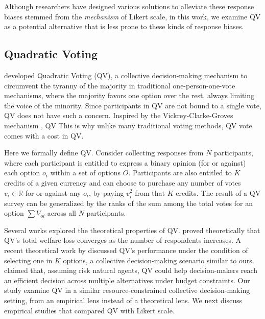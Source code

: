 Although researchers have designed various solutions to alleviate these response biases stemmed from the \textit{mechanism} of Likert scale, in this work, we examine QV as a potential alternative that is less prone to these kinds of response biases.

\subsection{Quadratic Voting}
\textcite{posner2018radical} developed Quadratic Voting (QV), a collective decision-making mechanism \cite{lalley2018quadratic} to circumvent the tyranny of the majority in traditional one-person-one-vote mechanisms, where the majority favors one option over the rest, always limiting the voice of the minority. Since participants in QV are not bound to a single vote, QV does not have such a concern. Inspired by the Vickrey-Clarke-Groves mechanism \cite{roughgarden2010algorithmic}, QV  This is why unlike many traditional voting methods, QV vote comes with a cost in QV.


Here we formally define QV. Consider collecting responses from $N$ participants, where each participant is entitled to express a binary opinion (for or against) each option $o_i$ within a set of options $O$. Participants are also entitled to $K$ credits of a given currency and can choose to purchase any number of votes $v_i \in \mathbb{R}$ for or against any $o_i$, by paying $v_i^2$ from that $K$ credits. The result of a QV survey can be generalized by the ranks of the sum among the total votes for an option $\sum{V_{oi}}$ across all $N$ participants.\par

Several works explored the theoretical properties of QV. \textcite{lalley2018quadratic} proved theoretically that QV's total welfare loss converges as the number of respondents increases. A recent theoretical work by \textcite{eguia2019quadratic} discussed QV's performance under the condition of selecting one in $K$ options, a collective decision-making scenario similar to ours. \textcite{eguia2019quadratic} claimed that, assuming risk natural agents, QV could help decision-makers reach an efficient decision across multiple alternatives under budget constraints. Our study examine QV in a similar resource-constrained collective decision-making setting, from an empirical lens instead of a theoretical lens. We next discuss empirical studies that compared QV with Likert scale.

